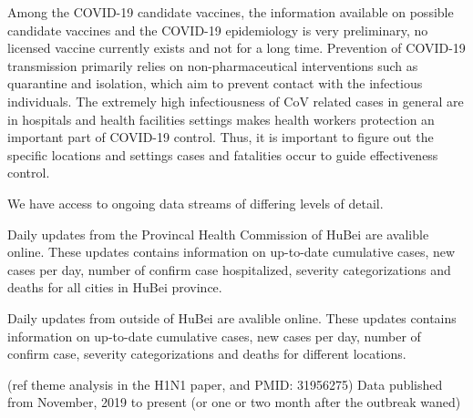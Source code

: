 Among the COVID-19 candidate vaccines, the information available on possible candidate vaccines and the
COVID-19 epidemiology is very preliminary, no licensed vaccine currently exists and not for a long time. 
Prevention of COVID-19 transmission primarily relies on non-pharmaceutical interventions such as quarantine and isolation, which aim to prevent contact with the infectious individuals. 
The extremely high infectiousness of CoV related cases in general are in hospitals and health facilities settings makes health workers protection an important part of COVID-19 control. 
Thus, it is important to figure out the specific locations and settings cases and fatalities occur to guide effectiveness control. 




We have access to ongoing data streams of differing levels of detail. 


Daily updates from the Provincal Health Commission of HuBei are avalible online.
These updates contains information on up-to-date cumulative cases, new cases per day, number of confirm case hospitalized, severity categorizations and deaths for all cities in HuBei province.

Daily updates from outside of HuBei are avalible online.
These updates contains information on up-to-date cumulative cases, new cases per day, number of confirm case, severity categorizations and deaths for different locations.


(ref theme analysis in the H1N1 paper, and PMID: 31956275) Data published from November, 2019 to present (or one or two month after the outbreak waned)

